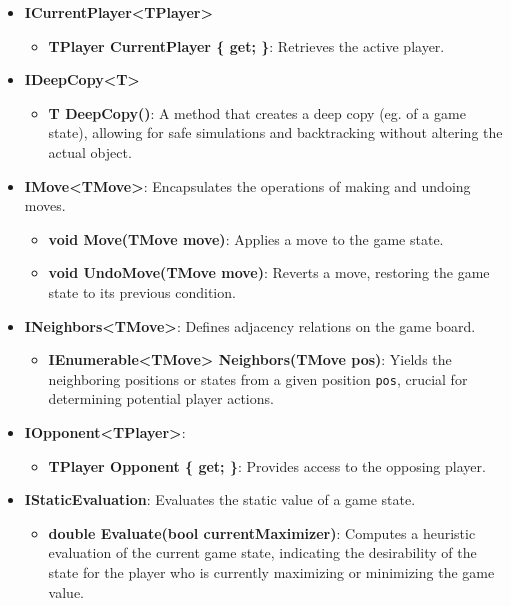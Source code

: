 \begin{itemize}
    \item \textbf{ICurrentPlayer\textless{}TPlayer\textgreater{}}
        \begin{itemize}
            \item \textbf{TPlayer CurrentPlayer \{ get; \}}: Retrieves the active player.
        \end{itemize}

    \item \textbf{IDeepCopy\textless{}T\textgreater{}}
        \begin{itemize}
            \item \textbf{T DeepCopy()}: A method that creates a deep copy (eg. of a game state), allowing for safe simulations and backtracking without altering the actual object.
        \end{itemize}

    \item \textbf{IMove\textless{}TMove\textgreater{}}: Encapsulates the operations of making and undoing moves.
        \begin{itemize}
            \item \textbf{void Move(TMove move)}: Applies a move to the game state.
            \item \textbf{void UndoMove(TMove move)}: Reverts a move, restoring the game state to its previous condition.
        \end{itemize}

    \item \textbf{INeighbors\textless{}TMove\textgreater{}}: Defines adjacency relations on the game board.
        \begin{itemize}
            \item \textbf{IEnumerable\textless{}TMove\textgreater{} Neighbors(TMove pos)}: Yields the neighboring positions or states from a given position \texttt{pos}, crucial for determining potential player actions.
        \end{itemize}

    \item \textbf{IOpponent\textless{}TPlayer\textgreater{}}:
        \begin{itemize}
            \item \textbf{TPlayer Opponent \{ get; \}}: Provides access to the opposing player.
        \end{itemize}

    \item \textbf{IStaticEvaluation}: Evaluates the static value of a game state.
        \begin{itemize}
            \item \textbf{double Evaluate(bool currentMaximizer)}: Computes a heuristic evaluation of the current game state, indicating the desirability of the state for the player who is currently maximizing or minimizing the game value.
        \end{itemize}


\end{itemize}
